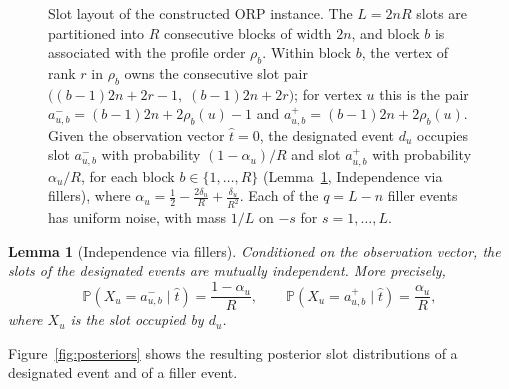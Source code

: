 \documentclass[11pt]{article}
\newtheorem{lemma}{Lemma}
\newcommand{\Prb}{\mathbb{P}}
\begin{document}
\begin{figure}[ht]

\caption{Slot layout of the constructed ORP instance.  The $L=2nR$ slots are
partitioned into $R$ consecutive blocks of width $2n$, and block $b$ is
associated with the profile order $\rho_b$.  Within block $b$, the vertex of
rank $r$ in $\rho_b$ owns the consecutive slot pair
$\bigl((b{-}1)2n+2r-1,\;(b{-}1)2n+2r\bigr)$; for vertex $u$ this is the pair
$a^-_{u,b}=(b{-}1)2n+2\rho_b(u)-1$ and $a^+_{u,b}=(b{-}1)2n+2\rho_b(u)$.
Given the observation vector $\hat t=0$, the designated event $d_u$ occupies
slot $a^-_{u,b}$ with probability $(1-\alpha_u)/R$ and slot $a^+_{u,b}$ with
probability $\alpha_u/R$, for each block $b\in\{1,\ldots,R\}$
(Lemma~\ref{lem:independence}, Independence via fillers), where
$\alpha_u=\tfrac12-\tfrac{2\delta_u}{R}+\tfrac{\delta_u}{R^2}$.  Each of the
$q=L-n$ filler events has uniform noise, with mass $1/L$ on $-s$ for
$s=1,\ldots,L$.}
\label{fig:slots}
\end{figure}

\begin{lemma}[Independence via fillers]\label{lem:independence}
Conditioned on the observation vector, the slots of the designated events are mutually independent.  More precisely,
\begin{equation}
  \Prb(X_u=a_{u,b}^-\mid \hat t)=\frac{1-\alpha_u}{R},
  \qquad
  \Prb(X_u=a_{u,b}^+\mid \hat t)=\frac{\alpha_u}{R},
\end{equation}
where $X_u$ is the slot occupied by $d_u$.
\end{lemma}

\noindent
Figure~\ref{fig:posteriors} shows the resulting posterior slot distributions of a designated event and of a filler event.
\end{document}
